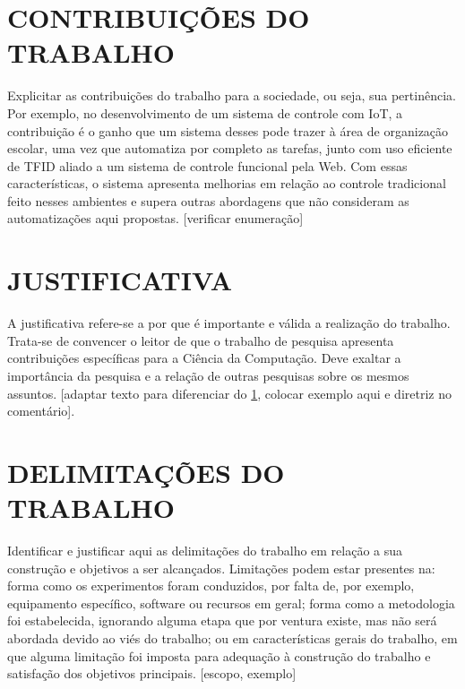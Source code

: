 \section{CONTRIBUIÇÕES DO TRABALHO}\label{sec:CONTRIBUICOES}
Explicitar as contribuições do trabalho para a sociedade, ou seja, sua pertinência. Por exemplo, no desenvolvimento de um sistema de controle com IoT, a contribuição é o ganho que um sistema desses pode trazer à área de organização escolar, uma vez que automatiza por completo as tarefas, junto com uso eficiente de TFID aliado a um sistema de controle funcional pela Web. Com essas características, o sistema apresenta melhorias em relação ao controle tradicional feito nesses ambientes e supera outras abordagens que não consideram as automatizações aqui propostas. [verificar enumeração]


\section{JUSTIFICATIVA}\label{sec:JUSTIFICATIVA}
A justificativa refere-se a por que é importante e válida a realização do trabalho. Trata-se de convencer o leitor de que o trabalho de pesquisa  apresenta contribuições específicas para a Ciência da Computação. Deve exaltar a importância da pesquisa e a relação de outras pesquisas sobre os mesmos assuntos. [adaptar texto para diferenciar do \ref{sec:CONTRIBUICOES}, colocar exemplo aqui e diretriz no comentário].


\section{DELIMITAÇÕES DO TRABALHO}\label{sec:DELIMITACOES}
Identificar e justificar aqui as delimitações do trabalho em relação a sua construção e objetivos a ser alcançados. Limitações podem estar presentes na: forma como os experimentos foram conduzidos, por falta de, por exemplo, equipamento específico, software ou recursos em geral; forma como a metodologia foi estabelecida, ignorando alguma etapa que por ventura existe, mas não será abordada devido ao viés do trabalho; ou em características gerais do trabalho, em que alguma limitação foi imposta para adequação à construção do trabalho e satisfação dos objetivos principais. [escopo, exemplo]